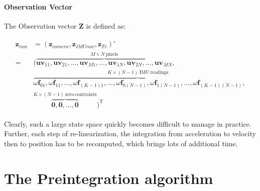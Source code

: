 \documentclass[12pt]{article}   %
\begin{document}
\paragraph{Observation Vector}
The Observation vector $\textbf{Z}$ is defined as:

\begin{align*}
\begin{split}
\textbf{z}_{raw} &= (\textbf{z}_{camera}, \textbf{z}_{IMUraw}, \textbf{z}_{Tv})' \nonumber \\
=& (\overbrace{\textbf{uv}_{11}, \textbf{uv}_{21}, ... , \textbf{uv}_{M1}, ..., \textbf{uv}_{1N}, \textbf{uv}_{2N}, ... , \textbf{uv}_{MN}}^{M \times N \ {\mathrm{pixels}}}, \nonumber \\ 
& \overbrace{\omega\textbf{f}_{01}, \omega\textbf{f}_{11}, ... , \omega\textbf{f}_{(K-1)1}, ..., \omega\textbf{f}_{0(N-1)}, \omega\textbf{f}_{1(N-1)}, ... , \omega\textbf{f}_{(K-1)(N-1)}}^{K \times (N-1) \ {\mathrm{IMU \ readings}}}, \\
& \overbrace{\textbf{0}, \textbf{0}, ... , \textbf{0}}^{K \times (N-1)  \ {\mathrm{ zero \ contraints}}})^{\mathrm{T}}
\end{split}
\end{align*}

Clearly, such a large state space quickly becomes difficult to manage in
practice. Further, each step of re-linearization, the integration from
acceleration to velocity then to position has to be recomputed, which brings
lots of additional time.

\section{The Preintegration algorithm}
\end{document}
